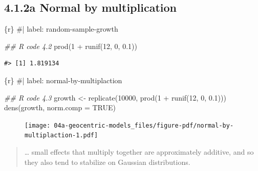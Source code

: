 \documentclass[
  letterpaper,
  DIV=11,
  numbers=noendperiod]{scrreprt}
\newenvironment{Shaded}{\begin{snugshade}}{\end{snugshade}}
\newcommand{\AttributeTok}[1]{\textcolor[rgb]{0.40,0.45,0.13}{#1}}
\newcommand{\CommentTok}[1]{\textcolor[rgb]{0.37,0.37,0.37}{#1}}
\newcommand{\ConstantTok}[1]{\textcolor[rgb]{0.56,0.35,0.01}{#1}}
\newcommand{\DecValTok}[1]{\textcolor[rgb]{0.68,0.00,0.00}{#1}}
\newcommand{\DocumentationTok}[1]{\textcolor[rgb]{0.37,0.37,0.37}{\textit{#1}}}
\newcommand{\FloatTok}[1]{\textcolor[rgb]{0.68,0.00,0.00}{#1}}
\newcommand{\FunctionTok}[1]{\textcolor[rgb]{0.28,0.35,0.67}{#1}}
\newcommand{\InformationTok}[1]{\textcolor[rgb]{0.37,0.37,0.37}{#1}}
\newcommand{\NormalTok}[1]{\textcolor[rgb]{0.00,0.23,0.31}{#1}}
\newcommand{\OtherTok}[1]{\textcolor[rgb]{0.00,0.23,0.31}{#1}}
\newcommand{\SpecialCharTok}[1]{\textcolor[rgb]{0.37,0.37,0.37}{#1}}
\begin{document}
\hypertarget{a-normal-by-multiplication}{%
\subsection{4.1.2a Normal by
multiplication}\label{a-normal-by-multiplication}}

\begin{Shaded}
\begin{Highlighting}[]
\InformationTok{\textasciigrave{}\textasciigrave{}\textasciigrave{}\{r\}}
\CommentTok{\#| label: random{-}sample{-}growth}

\DocumentationTok{\#\# R code 4.2}
\FunctionTok{prod}\NormalTok{(}\DecValTok{1} \SpecialCharTok{+} \FunctionTok{runif}\NormalTok{(}\DecValTok{12}\NormalTok{, }\DecValTok{0}\NormalTok{, }\FloatTok{0.1}\NormalTok{))}
\InformationTok{\textasciigrave{}\textasciigrave{}\textasciigrave{}}
\end{Highlighting}
\end{Shaded}

\begin{verbatim}
#> [1] 1.819134
\end{verbatim}

\begin{Shaded}
\begin{Highlighting}[]
\InformationTok{\textasciigrave{}\textasciigrave{}\textasciigrave{}\{r\}}
\CommentTok{\#| label: normal{-}by{-}multiplaction}

\DocumentationTok{\#\# R code 4.3}
\NormalTok{growth }\OtherTok{\textless{}{-}} \FunctionTok{replicate}\NormalTok{(}\DecValTok{10000}\NormalTok{, }\FunctionTok{prod}\NormalTok{(}\DecValTok{1} \SpecialCharTok{+} \FunctionTok{runif}\NormalTok{(}\DecValTok{12}\NormalTok{, }\DecValTok{0}\NormalTok{, }\FloatTok{0.1}\NormalTok{)))}
\FunctionTok{dens}\NormalTok{(growth, }\AttributeTok{norm.comp =} \ConstantTok{TRUE}\NormalTok{)}
\InformationTok{\textasciigrave{}\textasciigrave{}\textasciigrave{}}
\end{Highlighting}
\end{Shaded}

\begin{figure}[H]

{\centering \texttt{[image: 04a-geocentric-models\_files/figure-pdf/normal-by-multiplaction-1.pdf]}

}

\end{figure}

\begin{quote}
\ldots{} small effects that multiply together are approximately
additive, and so they also tend to stabilize on Gaussian distributions.
\end{quote}
\end{document}
